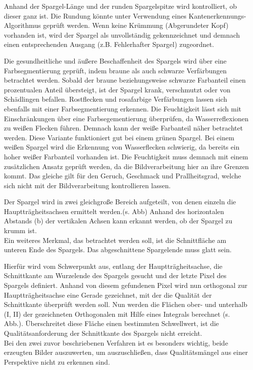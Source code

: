 \documentclass{ezb}
\begin{document}
Anhand der Spargel-Länge und der runden Spargelspitze wird kontrolliert, ob dieser ganz ist. Die Rundung könnte unter Verwendung eines Kantenerkennungs-Algorithmus geprüft werden. Wenn keine Krümmung (Abgerundeter Kopf) vorhanden ist, wird der Spargel als unvollständig gekennzeichnet und demnach einen entsprechenden Ausgang (z.B. \glqq Fehlerhafter Spargel\grqq) zugeordnet. 

Die gesundheitliche und äußere Beschaffenheit des Spargels wird über eine Farbsegmentierung geprüft, indem braune als auch schwarze Verfärbungen betrachtet werden. Sobald der braune beziehungsweise schwarze Farbanteil einen prozentualen Anteil übersteigt, ist der Spargel krank, verschmutzt oder von Schädlingen befallen. Rostflecken und rosafarbige Verfärbungen lassen sich ebenfalls mit einer Farbsegmentierung erkennen.
Die Feuchtigkeit lässt sich mit Einschränkungen über eine Farbsegementierung überprüfen, da Wasserreflexionen zu weißen Flecken führen. Demnach kann der weiße Farbanteil näher betrachtet werden. Diese Variante funktioniert gut bei einem grünen Spargel. Bei einem weißen Spargel wird die Erkennung von Wasserflecken schwierig, da bereits ein hoher weißer Farbanteil vorhanden ist. Die Feuchtigkeit muss demnach mit einem zusätzlichen Ansatz geprüft werden, da die Bildverarbeitung hier an ihre Grenzen kommt. Das gleiche gilt für den Geruch, Geschmack und Prallheitsgrad, welche sich nicht mit der Bildverarbeitung kontrollieren lassen.

Der Spargel wird in zwei gleichgroße Bereich aufgeteilt, von denen einzeln die Hauptträgheitsachsen ermittelt werden.(s. Abb)
Anhand des horizontalen Abstands (b) der vertikalen Achsen kann erkannt werden, ob der Spargel zu krumm ist.\\

Ein weiteres Merkmal, das betrachtet werden soll, ist die Schnittfläche am unteren Ende des Spargels. Das abgeschnittene Spargelende muss glatt sein.

Hierfür wird vom Schwerpunkt aus, entlang der Hauptträgheitsachse, die Schnittkante am Wurzelende des Spargels gesucht und der letzte Pixel des Spargels definiert.
Anhand von diesem gefundenen Pixel wird nun orthogonal zur Hauptträgheitsachse eine Gerade gezeichnet, mit der  die Qualität der Schnittkante überprüft werden soll.
Nun werden die Flächen ober- und unterhalb (I, II) der gezeichneten Orthogonalen mit Hilfe eines Integrals berechnet (s. Abb.).
Überschreitet diese Fläche einen bestimmten Schwellwert, ist die Qualitätsanforderung der Schnittkante des Spargels nicht erreicht.
\\
Bei den zwei zuvor beschriebenen Verfahren ist es besonders wichtig, beide erzeugten Bilder auszuwerten, um auszuschließen, dass Qualitätsmängel aus einer Perspektive nicht zu erkennen sind.
\end{document}
